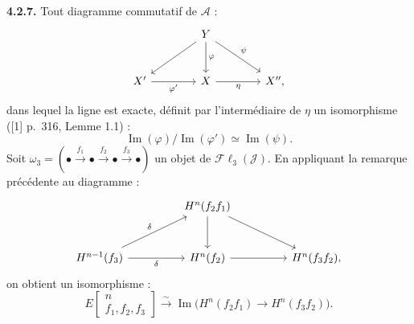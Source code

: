 \medskip\noindent\textbf{4.2.7.}
Tout diagramme commutatif de $\mathcal A$ :
\[
\begin{tikzcd}[column sep=4em,row sep=2.7em]
&Y\arrow[dl]\arrow[d,"\varphi"]\arrow[dr,"\psi"]&\\
X'\arrow[r,"\varphi'"']&X\arrow[r,"\eta"']&X'',
\end{tikzcd}
\]
dans lequel la ligne est exacte, définit par l'intermédiaire de $\eta$ un
isomorphisme ([1] p.~316, Lemme 1.1) :
\[
\operatorname{Im}(\varphi)\big/\operatorname{Im}(\varphi')
\simeq\operatorname{Im}(\psi).
\]
Soit
$\omega_3=(\mathord\bullet\xrightarrow{f_1}\mathord\bullet
\xrightarrow{f_2}\mathord\bullet\xrightarrow{f_3}\mathord\bullet)$
un objet de $\mathcal{F}\ell_3(\mathcal J)$. En appliquant la remarque
précédente au diagramme :
\[
\begin{tikzcd}[column sep=4.6em,row sep=2.8em]
&H^n(f_2f_1)\arrow[d]\arrow[dr]&\\
H^{n-1}(f_3)\arrow[ur,"\delta"]\arrow[r,"\delta"']&
H^n(f_2)\arrow[r]&H^n(f_3f_2),
\end{tikzcd}
\]
on obtient un isomorphisme :
\[
E\!\begin{bmatrix}n\\ f_1,f_2,f_3\end{bmatrix}
\xrightarrow{\ \sim\ }
\operatorname{Im}\bigl(H^n(f_2f_1)\longrightarrow H^n(f_3f_2)\bigr).
\tag{4.2.7.1}
\]
\endgroup
